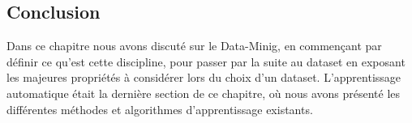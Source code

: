 \subsection{Conclusion}
Dans ce chapitre nous avons discuté sur le Data-Minig, en commençant par définir ce qu'est cette discipline, pour passer par la suite au dataset en exposant les majeures propriétés à considérer lors du choix d'un dataset. L'apprentissage automatique était la dernière section de ce chapitre, où nous avons présenté les différentes méthodes et algorithmes d'apprentissage existants. 

